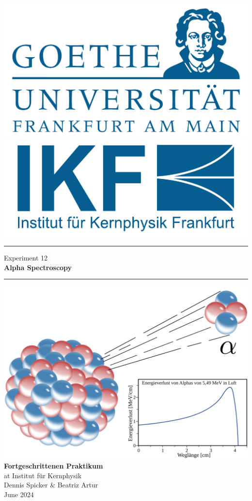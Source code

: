 \documentclass{scrartcl}
\begin{document}
	
\begin{titlepage}
	\newcommand{\HRule}{\rule{\textwidth}{0.5mm}}
	\begin{center}
		{\includegraphics[width=0.3\linewidth]{img/GU-Logo-blau-CMYK} \hfill
			\includegraphics[width=0.3\linewidth]{img/IKF_Logo} \\ }
		\vspace{1cm}
		\HRule
		\vspace{0.4cm}
		{\huge Experiment 12} \\
		\vspace{0.5cm}
		{\huge {\bfseries Alpha Spectroscopy}} \\
		\vspace{0.2cm}
		\HRule
		\vfill
		\includegraphics[width=14cm]{img/front_cover.png}
		\vfill
		{\Large\bfseries Fortgeschrittenen Praktikum} \\
		\vspace{0.3cm}
		{\Large at Institut für Kernphysik} \\
		\vspace{1.5cm}
		{\small 
			Dennis Spicker \& Beatriz Artur \\
			June 2024
		}
	\end{center} 
	\thispagestyle{empty}
	\clearpage
\end{titlepage}
\end{document}
